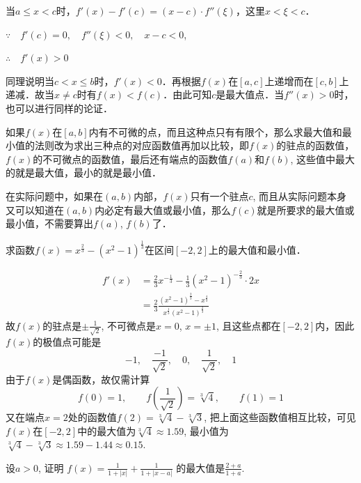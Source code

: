 当$a\le x<c$时，$f'(x)-f'(c)=(x-c)\cdot f''(\xi)$，这里$x<\xi<c$．

$\because\quad f' (c) =0,\quad f'' (\xi)<0,\quad x-c<0$,

$\therefore\quad f'(x)>0$

同理说明当$c<x\le b$时，$f'(x)<0$．再根据$f(x)$在$[a,c]$上递增而在$[c,b]$上递减．故当$x\ne c$时有$f(x)<f(c)$．由此可知$c$是最大值点．当$f''(x)>0$时，也可以进行同样的论证．

如果$f(x)$在$[a,b]$内有不可微的点，而且这种点只有有限个，那么求最大值和最小值的法则改为求出三种点的对应函数值再加以比较，即$f(x)$的驻点的函数值，$f(x)$的不可微点的函数值，最后还有端点的函数值$f(a)$和$f(b)$, 这些值中最大的就是最大值，最小的就是最小值．

在实际问题中，如果在$(a,b)$内部，$f(x)$只有一个驻点$c$, 而且从实际问题本身又可以知道在$(a,b)$内必定有最大值或最小值，那么$f(c)$就是所要求的最大值或最小值，不需要算出$f(a)$, $f(b)$了．

\begin{example}
求函数$f(x)=x^{\tfrac{2}{3}}-(x^2-1)^{\tfrac{1}{3}}$在区间$[-2,2]$上的最大值和最小值．
\end{example}


\begin{solution}
\begin{align*}
f'(x)&=\frac{2}{3}x^{-\tfrac{1}{3}}-\frac{1}{3}(x^2-1)^{-\tfrac{2}{3}}\cdot 2x\\
&=\frac{2}{3} \frac{(x^2-1)^{\tfrac{2}{3}}-x^{\tfrac{4}{3}}}{x^{\tfrac{1}{3}}(x^2-1)^{\tfrac{2}{3}}}    
\end{align*}
    故$f(x)$的驻点是$\pm\frac{1}{\sqrt{2}}$, 不可微点是$x=0$, $x=\pm 1$, 且这些点都在$[-2, 2]$内，因此$f(x)$的极值点可能是
\[-1,\quad \frac{-1}{\sqrt{2}},\quad  0,\quad \frac{1}{\sqrt{2}},\quad  1\]
    由于$f(x)$是偶函数，故仅需计算
\[    f (0) =1,\qquad f\left(\frac{1}{\sqrt{2}}\right) =\sqrt[3]{4},\qquad f (1) =1\]
    又在端点$x=2$处的函数值$f(2)=\sqrt[3]{4}-\sqrt[3]{3}$, 把上面这些函数值相互比较，可见$f(x)$在$[-2, 2]$中的最大值为$\sqrt[3]{4}\approx 1.59$, 最小值为$\sqrt[3]{4}-\sqrt[3]{3}\approx 1.59-1. 44\approx 0.15$.
\end{solution}

\begin{example}
    设$a>0$, 证明
$    f (x) =\frac{1}{1+|x|}+\frac{1}{1+|x-a|}$
    的最大值是$\frac{2+a}{1+a}$.
\end{example}    


